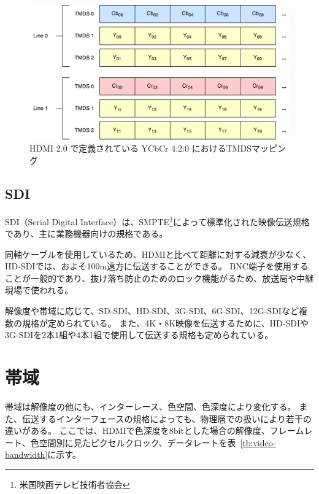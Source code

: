 \begin{figure}[htbp]
  \begin{center}
    \includegraphics[bb=0 0 591 306,width=15.5cm]{img/hdmi-spec-yuv-420.pdf}
  \end{center}
  \caption{HDMI 2.0 で定義されている YCbCr 4:2:0 におけるTMDSマッピング}
  \label{fig:hdmi-spec-yuv-420}
\end{figure}

\subsection{SDI}

SDI（Serial Digital Interface）は、SMPTE\footnote{米国映画テレビ技術者協会}によって標準化された映像伝送規格であり、主に業務機器向けの規格である。

同軸ケーブルを使用しているため、HDMIと比べて距離に対する減衰が少なく、HD-SDIでは、およそ100m遠方に伝送することができる。
BNC端子を使用することが一般的であり、抜け落ち防止のためのロック機能がるため、放送局や中継現場で使われる。

解像度や帯域に応じて、SD-SDI、HD-SDI、3G-SDI、6G-SDI、12G-SDIなど複数の規格が定められている。
また、4K・8K映像を伝送するために、HD-SDIや3G-SDIを2本1組や4本1組で使用して伝送する規格も定められている。

\section{帯域}
\label{sec:bandwidth}
帯域は解像度の他にも、インターレース、色空間、色深度により変化する。
また、伝送するインターフェースの規格によっても、物理層での扱いにより若干の違いがある。
ここでは、HDMIで色深度を8bitとした場合の解像度、フレームレート、色空間別に見たピクセルクロック、データレートを表~\ref{tb:video-bandwidth}に示す。

